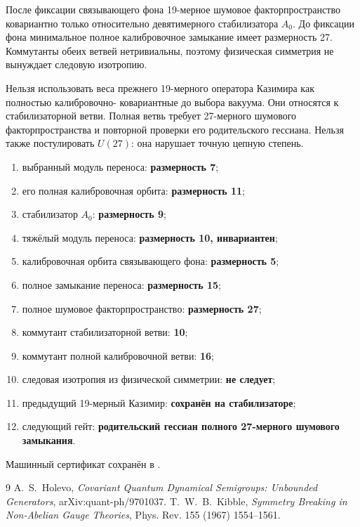 \begin{theorem}
После фиксации связывающего фона 19-мерное шумовое факторпространство ковариантно только
относительно девятимерного стабилизатора $A_0$. До фиксации фона минимальное
полное калибровочное замыкание имеет размерность 27. Коммутанты обеих ветвей
нетривиальны, поэтому физическая симметрия не вынуждает следовую изотропию.
\end{theorem}

\begin{nogocriterion}
Нельзя использовать веса прежнего 19-мерного оператора Казимира как полностью калибровочно-
ковариантные до выбора вакуума. Они относятся к стабилизаторной ветви.
Полная ветвь требует 27-мерного шумового факторпространства и повторной проверки его
родительского гессиана. Нельзя также постулировать $U(27)$: она нарушает
точную цепную степень.
\end{nogocriterion}

\begin{protocol}
\begin{enumerate}
 \item выбранный модуль переноса: \textbf{размерность 7};
 \item его полная калибровочная орбита: \textbf{размерность 11};
 \item стабилизатор $A_0$: \textbf{размерность 9};
 \item тяжёлый модуль переноса: \textbf{размерность 10, инвариантен};
 \item калибровочная орбита связывающего фона: \textbf{размерность 5};
 \item полное замыкание переноса: \textbf{размерность 15};
 \item полное шумовое факторпространство: \textbf{размерность 27};
 \item коммутант стабилизаторной ветви: \textbf{10};
 \item коммутант полной калибровочной ветви: \textbf{16};
 \item следовая изотропия из физической симметрии: \textbf{не следует};
 \item предыдущий 19-мерный Казимир: \textbf{сохранён на стабилизаторе};
 \item следующий гейт: \textbf{родительский гессиан полного
 27-мерного шумового замыкания}.
\end{enumerate}
\end{protocol}

Машинный сертификат сохранён в
.

\begin{thebibliography}{9}
A.~S.~Holevo,
\emph{Covariant Quantum Dynamical Semigroups: Unbounded Generators},
arXiv:quant-ph/9701037.
T.~W.~B.~Kibble,
\emph{Symmetry Breaking in Non-Abelian Gauge Theories},
Phys. Rev. 155 (1967) 1554--1561.
\end{thebibliography}